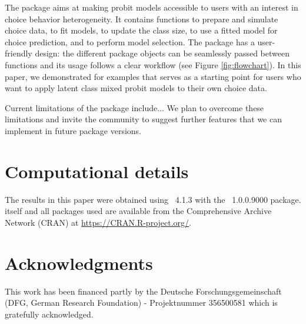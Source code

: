 \documentclass[article,shortnames]{jss}
\begin{document}
The  package aims at making probit models accessible to  users with an interest in choice behavior heterogeneity. It contains functions to prepare and simulate choice data, to fit models, to update the class size, to use a fitted model for choice prediction, and to perform model selection. The  package has a user-friendly design: the different package objects can be seamlessly passed between functions and its usage follows a clear workflow (see Figure \ref{fig:flowchart}). In this paper, we demonstrated for examples that serves as a starting point for  users who want to apply latent class mixed probit models to their own choice data.

Current limitations of the  package include... We plan to overcome these limitations and invite the community to suggest further features that we can implement in future package versions.

\section*{Computational details}

The results in this paper were obtained using
~4.1.3 with the
~1.0.0.9000 package.  itself
and all packages used are available from the Comprehensive
 Archive Network (CRAN) at \url{https://CRAN.R-project.org/}.


\section*{Acknowledgments}

This work has been financed partly by the Deutsche Forschungsgemeinschaft (DFG, German Research Foundation) - Projektnummer 356500581 which is gratefully acknowledged.


\end{document}
